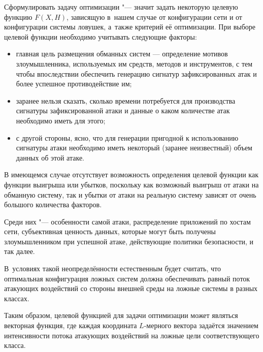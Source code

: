 \smallskip




Сформулировать задачу оптимизации "--- значит задать некоторую целевую функцию $F(X,H)$, зависящую в~нашем случае от конфигурации сети и от конфигурации системы ловушек, а~также критерий её оптимизации. При выборе целевой функции необходимо учитывать следующие факторы:

\begin{itemize}

\item главная цель размещения обманных систем — определение мотивов злоумышленника, используемых им средств, методов и инструментов, с тем чтобы впоследствии обеспечить генерацию сигнатур зафиксированных атак и более успешное противодействие им;

\item заранее нельзя сказать, сколько времени потребуется для производства сигнатуры зафиксированной атаки и данные о каком количестве атак необходимо иметь для этого;

\item с другой стороны, ясно, что для генерации пригодной к использованию сигнатуры атаки необходимо иметь некоторый (заранее неизвестный) объем данных об этой атаке.

\end{itemize}



В имеющемся случае отсутствует возможность определения целевой функции как функции выигрыша или убытков, поскольку как возможный выигрыш от атаки на обманную систему, так и убытки от атаки на реальную систему зависят от очень большого количества факторов. 

Среди них "--- особенности самой атаки, распределение приложений по хостам сети, субъективная ценность данных, которые могут быть получены злоумышленником при успешной атаке, действующие политики безопасности, и так далее. 

В~условиях такой неопределённости естественным будет считать, что оптимальная конфигурация ложных систем должна обеспечивать равный поток атакующих воздействий со стороны внешней среды на ложные системы в разных классах. 

Таким образом, целевой функцией для задачи оптимизации может являться векторная функция, где каждая координата $L$-мерного вектора задаётся значением интенсивности потока атакующих воздействий на ложные цели соответствующего класса. 


